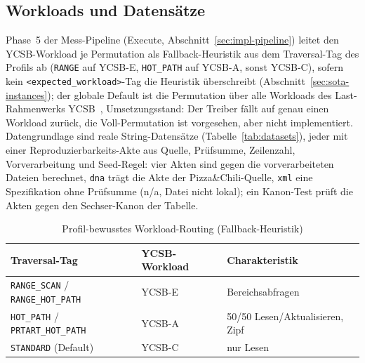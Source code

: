 \begin{nurkurz}
\subsection{Workloads und Datensätze}\label{sec:eval-workloads}
Phase~5 der Mess-Pipeline (Execute, Abschnitt~\ref{sec:impl-pipeline}) leitet den YCSB-Workload je
Permutation als Fallback-Heuristik aus dem Traversal-Tag des Profils ab (\texttt{RANGE} auf YCSB-E,
\texttt{HOT\_PATH} auf YCSB-A, sonst YCSB-C), sofern kein \texttt{<expected\_workload>}-Tag die Heuristik
überschreibt (Abschnitt~\ref{sec:sota-instances}); der globale Default ist die Permutation über alle
Workloads des Last-Rahmenwerks YCSB~\cite{cooper2010ycsb}, Umsetzungsstand: Der Treiber fällt auf genau
einen Workload zurück, die Voll-Permutation ist vorgesehen, aber nicht implementiert. Datengrundlage sind
reale String-Datensätze (Tabelle~\ref{tab:datasets}), jeder mit einer Reproduzierbarkeits-Akte aus Quelle,
Prüfsumme, Zeilenzahl, Vorverarbeitung und Seed-Regel: vier Akten sind gegen die vorverarbeiteten Dateien
berechnet, \texttt{dna} trägt die Akte der Pizza\&Chili-Quelle, \texttt{xml} eine Spezifikation ohne
Prüfsumme (n/a, Datei nicht lokal); ein Kanon-Test prüft die Akten gegen den Sechser-Kanon der Tabelle.
\end{nurkurz}

\begin{nurlang}
\begin{table}[!htbp]
  \centering
  \caption{Profil-bewusstes Workload-Routing (Fallback-Heuristik)}\label{tab:workload-routing}
  \begin{tabular}{lll}
    \toprule
    \textbf{Traversal-Tag} & \textbf{YCSB-Workload} & \textbf{Charakteristik} \\
    \midrule
    \texttt{RANGE\_SCAN} / \texttt{RANGE\_HOT\_PATH} & YCSB-E & Bereichsabfragen \\
    \texttt{HOT\_PATH} / \texttt{PRTART\_HOT\_PATH} & YCSB-A & 50/50 Lesen/Aktualisieren, Zipf \\
    \texttt{STANDARD} (Default) & YCSB-C & nur Lesen \\
    \bottomrule
  \end{tabular}
\end{table}
\end{nurlang}

